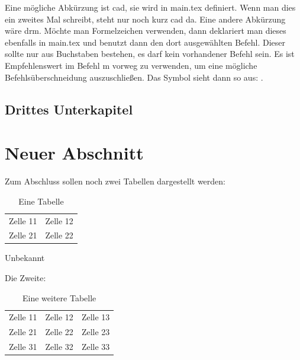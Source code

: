 Eine mögliche Abkürzung ist \ac{cad}, sie wird in main.tex definiert. Wenn man dies  ein zweites Mal schreibt, steht nur noch kurz \ac{cad} da. Eine andere Abkürzung wäre \ac{drm}. Möchte man Formelzeichen verwenden, dann deklariert man dieses ebenfalls in main.tex und benutzt dann den dort ausgewählten Befehl. Dieser sollte nur aus Buchstaben bestehen, es darf kein vorhandener Befehl sein. Es ist Empfehlenswert im Befehl m vorweg zu verwenden, um eine mögliche Befehlsüberschneidung auszuschließen. Das Symbol sieht dann so aus: \mEel.

\subsection{Drittes Unterkapitel}
\section{Neuer Abschnitt}
\lipsum[1-3]

Zum Abschluss sollen noch zwei Tabellen dargestellt werden:
\begin{table}[H]
\centering
\begin{tabular}{c c}
Zelle 11 & Zelle 12\\
Zelle 21 & Zelle 22\\
\end{tabular}
\caption{Eine Tabelle}
\label{tab:einetabelle}
\quelle Unbekannt
\end{table}

Die Zweite:
\begin{table}[H]
\centering
\begin{tabular}{l c r}
Zelle 11 & Zelle 12 & Zelle 13\\
Zelle 21 & Zelle 22 & Zelle 23\\
Zelle 31 & Zelle 32 & Zelle 33\\
\end{tabular}
\caption{Eine weitere Tabelle}
\label{tab:eineweiteretabelle}
\end{table}